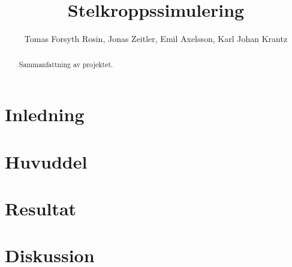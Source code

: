 \documentclass[a4paper,12pt,twocolumn,swedish]{article}
\begin{document}
\title{Stelkroppssimulering}
\author{Tomas Forsyth Rosin, Jonas Zeitler, Emil Axelsson, Karl Johan Krantz}
\begin{titlepage}
\maketitle
\thispagestyle{empty}
\end{titlepage}
\setcounter{page}{1}
\begin{abstract}
Sammanfattning av projektet.
\end{abstract}
\clearpage
\tableofcontents
\clearpage
\listoffigures
\clearpage
\listoftables
\clearpage
\setcounter{page}{1}
\section{Inledning}
\blindtext[1]
\section{Huvuddel}
\blindtext[1]
\section{Resultat}
\blindtext[1]
\section{Diskussion}
\blindtext[1]
\end{document}
